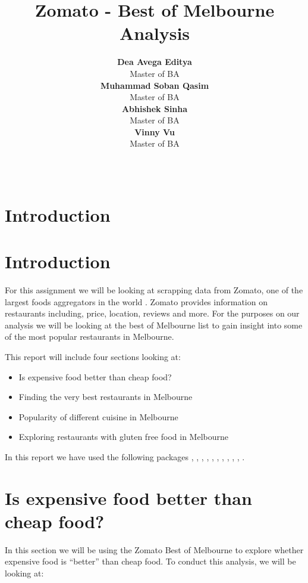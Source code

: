 \documentclass[11pt,a4paper,]{article}
\title{Zomato - Best of Melbourne Analysis}
\author{\sf\Large\textbf{ Dea Avega Editya}\\ {\sf\large Master of BA\\[0.5cm]} \sf\Large\textbf{ Muhammad Soban Qasim}\\ {\sf\large Master of BA\\[0.5cm]} \sf\Large\textbf{ Abhishek Sinha}\\ {\sf\large Master of BA\\[0.5cm]} \sf\Large\textbf{ Vinny Vu}\\ {\sf\large Master of BA\\[0.5cm]}}
\date{\sf\Date~\Month~\Year}
\makeatletter
\providecommand{\tightlist}{%
  \setlength{\itemsep}{0pt}\setlength{\parskip}{0pt}}
\def\titlepage{\front{\expandafter{\@title}}{\@author}{\@organization}}
\makeatother
\begin{document}
\titlepage

{
\setcounter{tocdepth}{2}
\tableofcontents
}
\clearpage

\section*{Introduction}

\hypertarget{introduction}{%
\section{Introduction}\label{introduction}}

For this assignment we will be looking at scrapping data from Zomato, one of the largest foods aggregators in the world \textcite{zomato}. Zomato provides information on restaurants including, price, location, reviews and more. For the purposes on our analysis we will be looking at the best of Melbourne list \textcite{zomatomelb} to gain insight into some of the most popular restaurants in Melbourne.

This report will include four sections looking at:

\begin{itemize}
\tightlist
\item
  Is expensive food better than cheap food?
\item
  Finding the very best restaurants in Melbourne
\item
  Popularity of different cuisine in Melbourne
\item
  Exploring restaurants with gluten free food in Melbourne
\end{itemize}

In this report we have used the following packages \textcite{tidyverse}, \textcite{romato}, \textcite{kableExtra}, \textcite{knitr}, \textcite{dplyr}, \textcite{ggplot2}, \textcite{leaflet}, \textcite{readr}, \textcite{mapview}, \textcite{viridis}, \textcite{plotly}.

\clearpage

\hypertarget{is-expensive-food-better-than-cheap-food}{%
\section{Is expensive food better than cheap food?}\label{is-expensive-food-better-than-cheap-food}}

In this section we will be using the Zomato Best of Melbourne to explore whether expensive food is ``better'' than cheap food. To conduct this analysis, we will be looking at:
\end{document}
